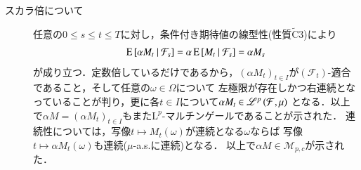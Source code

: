 \begin{description}
\begin{description}
				\item[スカラ倍について]
					任意の$0 \leq s \leq t \leq T$に対し，条件付き期待値の線型性(性質$\tilde{\mathrm{C}}3$)により
					\begin{align}
						\operatorname{E} \left[ \alpha M_t \ \middle|\ \mathcal{F}_s \right] = \alpha \operatorname{E} \left[ M_t \ \middle|\ \mathcal{F}_s \right] = \alpha M_s
					\end{align}
					が成り立つ．定数倍しているだけであるから，$(\alpha M_t)_{t \in I}$が$(\mathcal{F}_t)$-適合であること，そして任意の$\omega \in \Omega$について
					左極限が存在しかつ右連続となっていることが判り，更に各$t \in I$について$\alpha M_t \in \mathscr{L}^{p} \left(\mathcal{F},\mu\right)$
					となる．以上で$\alpha M = (\alpha M_t)_{t \in I}$もまた$\mathrm{L}^p$-マルチンゲールであることが示された．
					連続性については，写像$t \longmapsto M_t(\omega)$が連続となる$\omega$ならば
					写像$t \longmapsto \alpha M_t(\omega)$も連続($\mu$-a.s.に連続)となる．
					以上で$\alpha M \in \mathcal{M}_{p,c}$が示された．
			\end{description}
		

\end{description}
